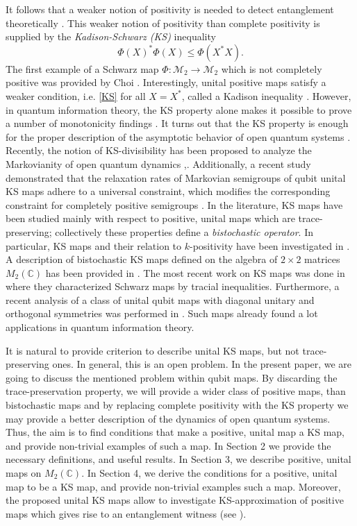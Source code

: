 \documentclass[11pt,reqno]{amsart}
\theoremstyle{definition}
\numberwithin{equation}{section} \setcounter{tocdepth}{1}
\numberwithin{equation}{section}
\begin{document}
  It follows that a weaker notion of positivity is needed to detect entanglement theoretically \cite{Paulsen,Stormer,BHATIA,PR}.
This weaker notion of positivity than complete positivity is supplied by the \textit{Kadison-Schwarz (KS)} inequality \cite{Kadison}
\begin{equation}\label{KS}
    \Phi(X)^*\Phi(X) \leq \Phi(X^*X).
\end{equation}
The first example of a Schwarz map $\Phi : \mathcal{M}_2 \to \mathcal{M}_2$ which is not completely positive was provided by Choi \cite{Choi2}. Interestingly, unital positive maps satisfy a weaker condition, i.e. \eqref{KS} for all $X=X^*$, called a Kadison inequality \cite{Kadison}.
However, in quantum information theory, the KS property alone makes it possible to prove a number of monotonicity findings \cite{Petz,Alex,Carlen}. It turns out that the KS property  is enough for the proper description of the asymptotic behavior of  open quantum systems \cite{Amato,C24}. Recently, the notion of KS-divisibility has been proposed to analyze the Markovianity of open quantum dynamics \cite{KS},\cite{Mario}. Additionally, a recent study \cite{GF} demonstrated that the relaxation rates of Markovian semigroups of qubit unital KS maps adhere to a universal constraint, which modifies the corresponding constraint for completely positive semigroups \cite{PRL,LAA}.
In the literature, KS maps have been studied mainly with respect to positive, unital maps which are trace-preserving; collectively these properties define a \textit{bistochastic operator}. In particular, KS maps and their relation to $k$-positivity have been investigated in \cite{robertson_schwarz_1983,Sun1,Sun2}. A description of bistochastic KS maps defined on the algebra of $2\times 2$ matrices $M_2(\mathbb{C})$ has been provided in \cite{MA21,MA13}.  The most recent work on KS maps was done in \cite{Alex} where they characterized Schwarz maps by tracial inequalities. Furthermore, a recent analysis of a class of unital qubit maps with diagonal unitary and orthogonal symmetries was performed in \cite{CB24,C24}. Such maps already found a lot applications in quantum information theory.

It is natural to provide criterion to describe unital KS maps, but not trace-preserving ones. In general, this is an open problem. In the present paper, we are going to discuss the mentioned problem within qubit maps. By discarding the trace-preservation property, we will provide a wider class of positive maps, than bistochastic maps and by replacing complete positivity with the KS property we may provide a better description of the dynamics of open quantum systems. Thus, the aim is to find conditions that make a positive, unital map a KS map, and provide non-trivial examples of such a map. In Section 2 we provide the necessary definitions, and useful results. In Section 3, we describe positive, unital maps on $M_2(\mathbb{C})$. In Section 4, we derive the conditions for a positive, unital map to be a KS map, and provide non-trivial examples such a map. Moreover, the proposed unital KS maps allow to investigate KS-approximation of positive maps which gives rise to an entanglement witness (see \cite{CMH20,Werner}).
\end{document}

